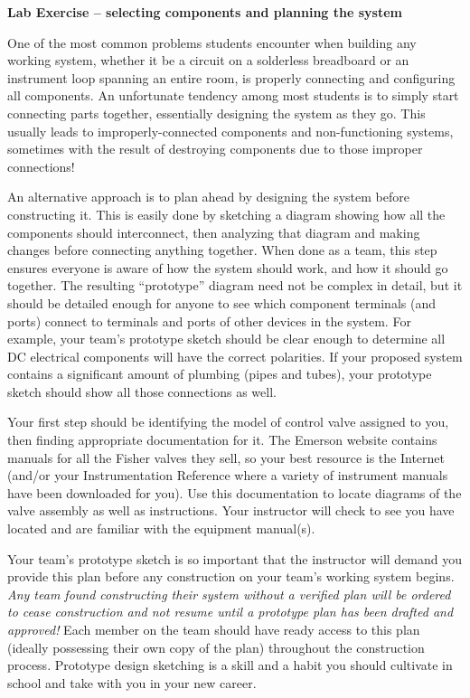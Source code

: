 \begin{itemize}
\vfil \eject

\noindent
{\bf Lab Exercise -- selecting components and planning the system}

\vskip 5pt

One of the most common problems students encounter when building any working system, whether it be a circuit on a solderless breadboard or an instrument loop spanning an entire room, is properly connecting and configuring all components.  An unfortunate tendency among most students is to simply start connecting parts together, essentially designing the system as they go.  This usually leads to improperly-connected components and non-functioning systems, sometimes with the result of destroying components due to those improper connections!

An alternative approach is to plan ahead by designing the system before constructing it.  This is easily done by sketching a diagram showing how all the components should interconnect, then analyzing that diagram and making changes before connecting anything together.  When done as a team, this step ensures everyone is aware of how the system should work, and how it should go together.  The resulting ``prototype'' diagram need not be complex in detail, but it should be detailed enough for anyone to see which component terminals (and ports) connect to terminals and ports of other devices in the system.  For example, your team's prototype sketch should be clear enough to determine all DC electrical components will have the correct polarities.  If your proposed system contains a significant amount of plumbing (pipes and tubes), your prototype sketch should show all those connections as well.

\vskip 10pt

Your first step should be identifying the model of control valve assigned to you, then finding appropriate documentation for it.  The Emerson website contains manuals for all the Fisher valves they sell, so your best resource is the Internet (and/or your Instrumentation Reference where a variety of instrument manuals have been downloaded for you).  Use this documentation to locate diagrams of the valve assembly as well as instructions.  Your instructor will check to see you have located and are familiar with the equipment manual(s).

\vskip 10pt

Your team's prototype sketch is so important that the instructor will demand you provide this plan before any construction on your team's working system begins.  {\it Any team found constructing their system without a verified plan will be ordered to cease construction and not resume until a prototype plan has been drafted and approved!}  Each member on the team should have ready access to this plan (ideally possessing their own copy of the plan) throughout the construction process.  Prototype design sketching is a skill and a habit you should cultivate in school and take with you in your new career.


\end{itemize}
